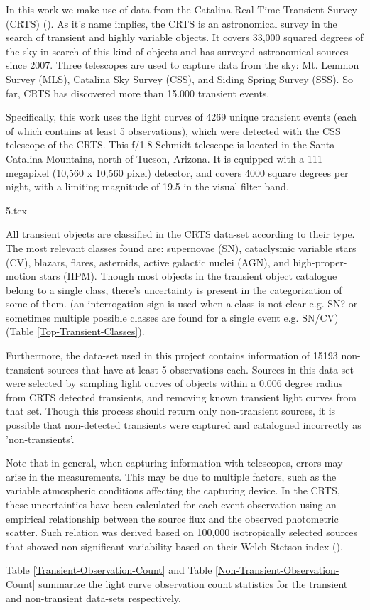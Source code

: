 
In this work we make use of data from the Catalina Real-Time Transient Survey (CRTS) (\cite{1111.2566}). As it's name implies, the CRTS is an astronomical survey in the search of transient and highly variable objects. It covers 33,000 squared degrees of the sky in search of this kind of objects and has surveyed astronomical sources since 2007. Three telescopes are used to capture data from the sky: Mt. Lemmon Survey (MLS), Catalina Sky Survey (CSS), and Siding Spring Survey (SSS). So far, CRTS has discovered more than 15.000 transient events.

Specifically, this work uses the light curves of 4269 unique transient events (each of which contains at least 5 observations), which were detected with the CSS telescope of the CRTS. This f/1.8 Schmidt telescope is located in the Santa Catalina Mountains, north of Tucson, Arizona. It is equipped with a 111-megapixel (10,560 x 10,560 pixel) detector, and covers 4000 square degrees per night, with a limiting magnitude of 19.5 in the visual filter band.

{5.tex}

All transient objects are classified in the CRTS data-set according to their type. The most relevant classes found are: supernovae (SN), cataclysmic variable stars (CV), blazars, flares, asteroids, active galactic nuclei (AGN), and high-proper-motion stars (HPM). Though most objects in the transient object catalogue belong to a single class, there's uncertainty is present in the categorization of some of them. (an interrogation sign is used when a class is not clear e.g. SN? or sometimes multiple possible classes are found for a single event e.g. SN/CV) (Table \ref{Top-Transient-Classes}).

Furthermore, the data-set used in this project contains information of 15193 non-transient sources that have at least 5 observations each. Sources in this data-set were selected by sampling light curves of objects within a 0.006 degree radius from CRTS detected transients, and removing known transient light curves from that set. Though this process should return only non-transient sources, it is possible that non-detected transients were captured and catalogued incorrectly as 'non-transients'.

Note that in general, when capturing information with telescopes, errors may arise in the measurements. This may be due to multiple factors, such as the variable atmospheric conditions affecting the capturing device. In the CRTS, these uncertainties have been calculated for each event observation using an empirical relationship between the source flux and the observed photometric scatter.%
Such relation was derived based on 100,000 isotropically selected sources that showed non-significant variability based on their Welch-Stetson index (\cite{1996PASP..108..851S}).

Table \ref{Transient-Observation-Count} and Table \ref{Non-Transient-Observation-Count} summarize the light curve observation count statistics for the transient and non-transient data-sets respectively.
